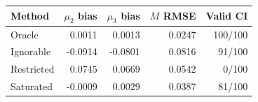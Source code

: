 \begin{tabular}{@{}lrrrr@{}}
\toprule
Method & $\mu_2$ bias & $\mu_3$ bias & $M$ RMSE & Valid CI\\
\midrule
Oracle & 0.0011 & 0.0013 & 0.0247 & 100/100\\
Ignorable & -0.0914 & -0.0801 & 0.0816 & 91/100\\
Restricted & 0.0745 & 0.0669 & 0.0542 & 0/100\\
Saturated & -0.0009 & 0.0029 & 0.0387 & 81/100\\
\bottomrule
\end{tabular}
